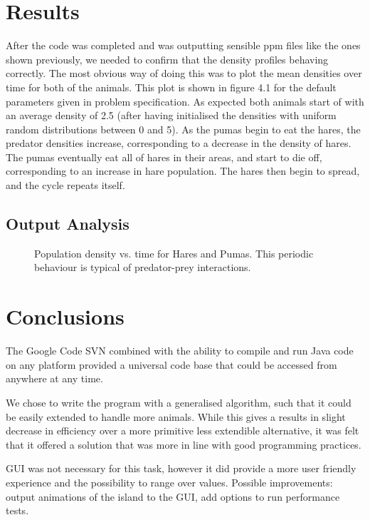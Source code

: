 \documentclass[11pt]{report}
\begin{document}
\chapter{Results}
After the code was completed and was outputting sensible ppm files like the ones shown previously, we needed to confirm that the density profiles behaving correctly. The most obvious way of doing this was to plot the mean densities over time for both of the animals. This plot is shown in figure 4.1 for the default parameters given in problem specification. As expected both animals start of with an average density of 2.5 (after having initialised the densities with uniform random distributions between 0 and 5). As the pumas begin to eat the hares, the predator densities increase, corresponding to a decrease in the density of hares.
The pumas eventually eat all of hares in their areas, and start to die off, corresponding to an increase in hare population. The hares then begin to spread, and the cycle repeats itself.

	\section{Output Analysis}
	\begin{figure}[H]
   
   
   \caption{Population density vs. time for Hares and Pumas. This periodic behaviour is typical of predator-prey interactions.}
   \end{figure}



\chapter{Conclusions} %

	The Google Code SVN combined with the ability to compile and run Java code on any platform provided a universal code base that could be accessed from anywhere at any time.  
	
We chose to write the program with a generalised algorithm, such that it could be easily extended to handle more animals. While this gives a results in slight decrease in efficiency over a more primitive less extendible alternative, it was felt that it offered a solution that was more in line with good programming practices.

GUI was not necessary for this task, however it did provide a more user friendly experience and the possibility to range over values. Possible improvements: output animations of the island to the GUI, add options to run performance tests.
  
\end{document}
